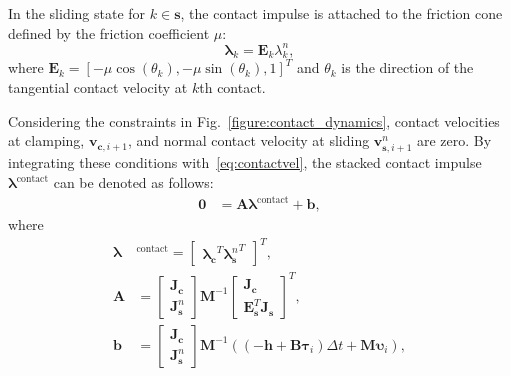 In the sliding state for $k\in\mathbf{s}$, the contact impulse is attached to the friction cone defined by the friction coefficient $\mu$:
\begin{equation}
\label{eq:slip_contact_impulse}
\bm{\lambda}_{k} =  \mathbf{E}_{k}{\lambda}^n_{k},
\end{equation}
where $\mathbf{E}_k = [-\mu\cos(\theta_k),  -\mu\sin(\theta_k), 1]^T$ and $\theta_{k}$ is the direction of the tangential contact velocity at $k$th contact. 

Considering the constraints in Fig.~\ref{figure:contact_dynamics}, contact velocities at clamping, $\textbf{v}_{\bm{c},i+1}$, and normal contact velocity at sliding $\textbf{v}^{n}_{\bm{s},i+1}$ are zero. By integrating these conditions with~\eqref{eq:contactvel}, the stacked contact impulse $\bm{\lambda}^{\mathrm{contact}}$ can be denoted as follows:
\begin{align}
    \label{eq:vcc_zero}
    \textbf{0} &= \mathbf{A}\bm{\lambda}^{\mathrm{contact}} + \mathbf{b},
\end{align}
where
\begin{align}
\bm{\lambda}&^{\mathrm{contact}}=\begin{bmatrix}
{\bm{\lambda}_\mathbf{c}}^T {\bm{\lambda}^n_\mathbf{s}}^T
\end{bmatrix}^T,
\nonumber\\
    \mathbf{A}&=\begin{bmatrix}
    \mathbf{J}_{\mathbf{c}}\nonumber\\
    \mathbf{J}^n_{\mathbf{s}}
    \end{bmatrix}
    \mathbf{M}^{-1}
    \begin{bmatrix}
    \mathbf{J}_{\mathbf{c}}\\
    \mathbf{E}^{T}_{\mathbf{s}}    \mathbf{J}_{\mathbf{s}}
    \end{bmatrix}^T,\nonumber\\
    \mathbf{b}&=\begin{bmatrix}
    \mathbf{J}_{\mathbf{c}}\\\mathbf{J}^n_{\mathbf{s}}
    \end{bmatrix}\mathbf{M}^{-1}\left((-\mathbf{h}+\mathbf{B} \boldsymbol{\tau}_{i})\Delta{t} + \mathbf{M}\boldsymbol{\upsilon}_i\right),\nonumber
\end{align}
